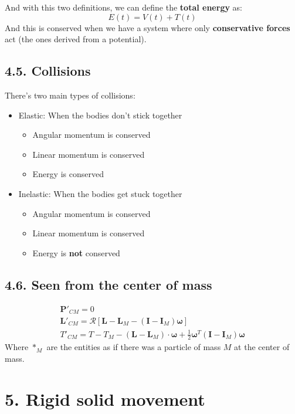 \documentclass[a4paper,landscape,10pt]{cheatsheet}
\begin{document}
And with this two definitions, we can define the \textbf{total energy} as:
$$
E(t) = V(t) + T(t)
$$
And this is conserved when we have a system where only \textbf{conservative forces} act (the ones derived from a
potential).

\subsection*{4.5. Collisions}
There's two main types of collisions:
\begin{itemize}
  \item Elastic: When the bodies don't stick together
  \begin{itemize}
    \item Angular momentum is conserved
    \item Linear momentum is conserved
    \item Energy is conserved
  \end{itemize}
  \item Inelastic: When the bodies get stuck together
  \begin{itemize}
    \item Angular momentum is conserved
    \item Linear momentum is conserved
    \item Energy is \textbf{not} conserved
  \end{itemize}
\end{itemize}
\subsection*{4.6. Seen from the center of mass}
\begin{gather*}
  \textbf{P}'_{CM} = 0 \\
  \textbf{L}'_{CM} = \mathcal{R}\left[\textbf{L} - \textbf{L}_M - \left(\textbf{I} - \textbf{I}_M\right)\boldsymbol{\omega}\right] \\
  T'_{CM} = T - T_M - (\textbf{L}-\textbf{L}_M)\cdot\boldsymbol{\omega} + \frac{1}{2}\boldsymbol{\omega}^T(\textbf{I} - \textbf{I}_M)\boldsymbol{\omega}
\end{gather*}
Where $*_M$ are the entities as if there was a particle of mass $M$ at the center of mass.

\section*{5. Rigid solid movement}
\end{document}
